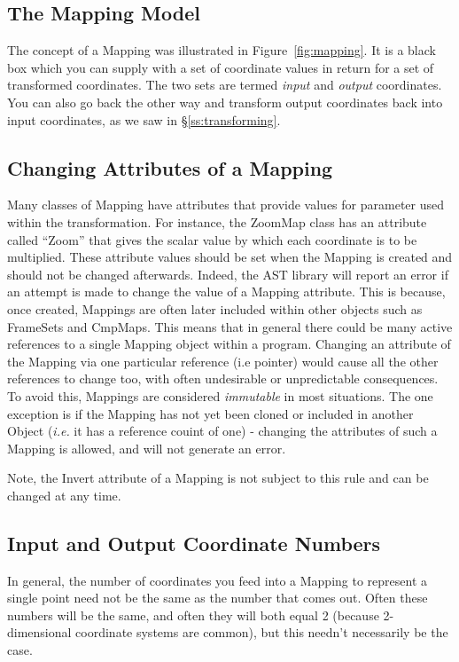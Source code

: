 \documentclass[twoside,11pt]{starlink}
\providecommand{\secref}[1]{\S\ref{#1}}
\begin{document}
\subsection{The Mapping Model}

The concept of a Mapping was illustrated in Figure~\ref{fig:mapping}.
It is a black box which you can supply with a set of coordinate values
in return for a set of transformed coordinates. The two sets are
termed \emph{input} and \emph{output} coordinates. You can also go
back the other way and transform output coordinates back into input
coordinates, as we saw in \secref{ss:transforming}.

\subsection{\label{ss:changingmapattrs}Changing Attributes of a Mapping}

Many classes of Mapping have attributes that provide values for parameter
used within the transformation. For instance, the ZoomMap class has an
attribute called ``Zoom'' that gives the scalar value by which each
coordinate is to be multiplied. These attribute values should be set when
the Mapping is created and should not be changed afterwards. Indeed, the
AST library will report an error if an attempt is made to change the
value of a Mapping attribute. This is because, once created, Mappings are
often later included within other objects such as FrameSets and CmpMaps.
This means that in general there could be many active references to a single
Mapping object within a program. Changing an attribute of the Mapping
via one particular reference (i.e pointer) would cause all the other
references to change too, with often undesirable or unpredictable
consequences. To avoid this, Mappings are considered \emph{immutable} in
most situations. The one exception is if the Mapping has not yet been
cloned or included in another Object (\emph{i.e.} it has a reference
couint of one) - changing the attributes of such a Mapping is allowed,
and will not generate an error.

Note, the Invert attribute of a Mapping is not subject to this rule and
can be changed at any time.

\subsection{Input and Output Coordinate Numbers}

In general, the number of coordinates you feed into a Mapping to
represent a single point need not be the same as the number that comes
out. Often these numbers will be the same, and often they will both
equal 2 (because 2-dimensional coordinate systems are common), but
this needn't necessarily be the case.
\end{document}
